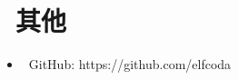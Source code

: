 \documentclass{resume}
\begin{document}

\section{\faInfo\ 其他}
\begin{itemize}[parsep=0.5ex]
  \item \faGithubAlt\ GitHub: https://github.com/elfcoda
\end{itemize}

%
%
\end{document}
